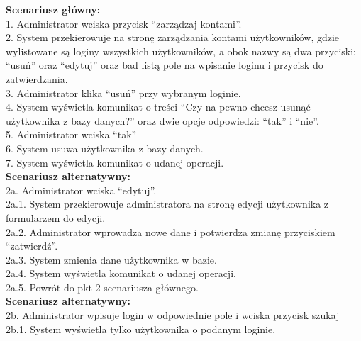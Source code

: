 \begin{enumerate}[label=(\Roman*)]
\textbf{Scenariusz główny:}\\
1. Administrator wciska przycisk “zarządzaj kontami”.\\
2. System przekierowuje na stronę zarządzania kontami użytkowników, gdzie
wylistowane są loginy wszystkich użytkowników, a obok nazwy są dwa przyciski:
“usuń” oraz “edytuj” oraz bad listą pole na wpisanie loginu i przycisk do
zatwierdzania.\\
3. Administrator klika “usuń” przy wybranym loginie.\\
4. System wyświetla komunikat o treści “Czy na pewno chcesz usunąć użytkownika z
bazy danych?” oraz dwie opcje odpowiedzi: “tak” i “nie”.\\
5. Administrator wciska “tak”\\
6. System usuwa użytkownika z bazy danych.\\
7. System wyświetla komunikat o udanej operacji.\\
\textbf{Scenariusz alternatywny:}\\
2a. Administrator wciska “edytuj”.\\
2a.1. System przekierowuje administratora na stronę edycji użytkownika z formularzem do
edycji.\\
2a.2. Administrator wprowadza nowe dane i potwierdza zmianę przyciskiem “zatwierdź”.\\
2a.3. System zmienia dane użytkownika w bazie.\\
2a.4. System wyświetla komunikat o udanej operacji.\\
2a.5. Powrót do pkt 2 scenariusza głównego.\\
\textbf{Scenariusz alternatywny:}\\
2b. Administrator wpisuje login w odpowiednie pole i wciska przycisk szukaj\\
2b.1. System wyświetla tylko użytkownika o podanym loginie.\\
\end{enumerate}